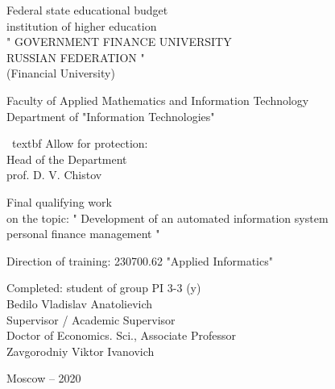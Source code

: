 \begin{titlepage}
  \begin{center}
    Federal state educational budget \\
    institution of higher education \\
    " GOVERNMENT FINANCE UNIVERSITY \\
    RUSSIAN FEDERATION " \\
    (Financial University)
  
  \vspace{1cm}
  
  Faculty of Applied Mathematics and Information Technology \\
  Department of "Information Technologies" \\
  \end{center}
  
  \vspace{1cm}
  
  \begin{flushright}
    \ textbf {Allow for protection:} \\
    Head of the Department \\
    prof. D. V. Chistov \\
  \end{flushright}
  
  \vspace{1cm}
  
  \begin{center}
    Final qualifying work \\
    on the topic: " Development of an automated information system \\ personal finance management "
  
    Direction of training: 230700.62 "Applied Informatics"
  \end{center}
  
  \vspace{1cm}
  
  \begin{flushright}
    Completed: student of group PI 3-3 (y) \\
    Bedilo Vladislav Anatolievich \\
    Supervisor / Academic Supervisor \\
    Doctor of Economics. Sci., Associate Professor \\
    Zavgorodniy Viktor Ivanovich
  \end{flushright}
  
  \vspace{1cm}
  
  \begin{center}
    Moscow -- 2020
  \end{center}
  
  \end{titlepage}